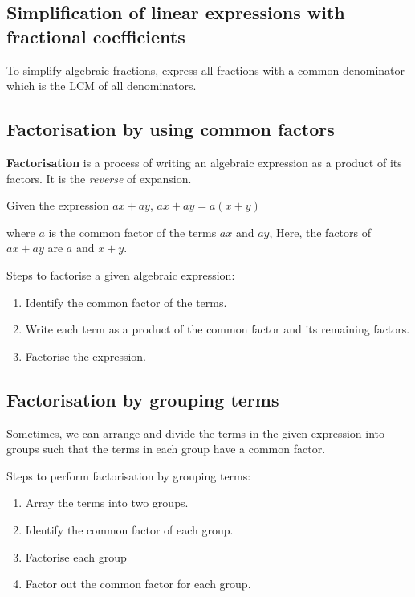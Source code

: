 \documentclass[../main]{subfiles}
\begin{document}
\subsection{Simplification of linear expressions with fractional coefficients}

To simplify algebraic fractions, express all fractions with a common denominator
which is the LCM of all denominators. 

\subsection{Factorisation by using common factors}
\textbf{Factorisation} is a process of writing an algebraic expression as a
product of its factors. It is the \textit{reverse} of expansion.

Given the expression \(ax+ay\),
\(ax + ay = a(x + y)\)

where \(a\) is the common factor of the terms \(ax\) and \(ay\), Here, the
factors of \(ax + ay\) are \(a\) and \(x + y\).


Steps to factorise a given algebraic expression:
\begin{enumerate}
\item  Identify the common factor of the terms.
 
\item  Write each term as a product of the common factor and its remaining
  factors.
 
\item  Factorise the expression.
  
\end{enumerate}

\subsection{Factorisation by grouping terms}

Sometimes, we can arrange and divide the terms in the given expression into
groups such that the terms in each group have a common factor.

Steps to perform factorisation by grouping terms:
\begin{enumerate}
\item Array the terms into two groups.
 
\item  Identify the common factor of each group.
\item  Factorise each group
\item Factor out the common factor for each group.
  
\end{enumerate}
\end{document}

